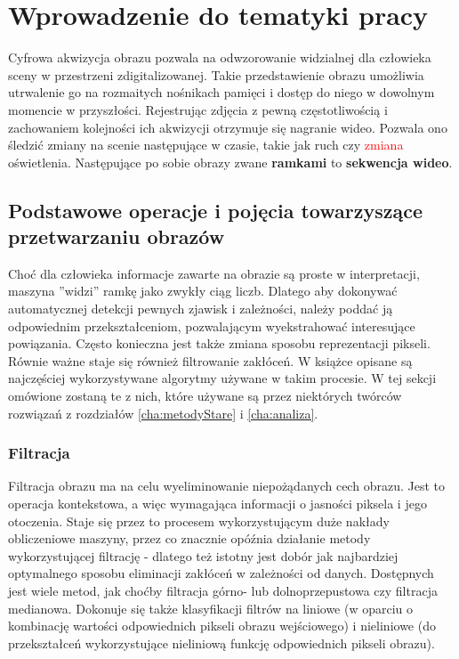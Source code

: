 \chapter{Wprowadzenie do tematyki pracy}
\label{cha:tematykaPracy}
Cyfrowa akwizycja obrazu pozwala na odwzorowanie widzialnej dla człowieka sceny w przestrzeni zdigitalizowanej. Takie przedstawienie obrazu umożliwia utrwalenie go na rozmaitych nośnikach pamięci i dostęp do niego w dowolnym momencie w przyszłości. Rejestrując zdjęcia z pewną częstotliwością i zachowaniem kolejności ich akwizycji otrzymuje się nagranie wideo. Pozwala ono śledzić zmiany na scenie następujące w czasie, takie jak ruch czy \textcolor{red}{zmiana} oświetlenia. Następujące po sobie obrazy zwane \textbf{ramkami} to \textbf{sekwencja wideo}.
\section{Podstawowe operacje i pojęcia towarzyszące przetwarzaniu obrazów}
Choć dla człowieka informacje zawarte na obrazie są proste w interpretacji, maszyna ''widzi'' ramkę jako zwykły ciąg liczb. Dlatego aby dokonywać automatycznej detekcji pewnych zjawisk i zależności, należy poddać ją odpowiednim przekształceniom, pozwalającym wyekstrahować interesujące powiązania. Często konieczna jest także zmiana sposobu reprezentacji pikseli. Równie ważne staje się również filtrowanie zakłóceń. W książce \cite{i1823330731} opisane są najczęściej wykorzystywane algorytmy używane w takim procesie. W tej sekcji omówione zostaną te z nich, które używane są przez niektórych twórców rozwiązań z rozdziałów \ref{cha:metodyStare} i \ref{cha:analiza}. 
\subsection{Filtracja}
Filtracja obrazu ma na celu wyeliminowanie niepożądanych cech obrazu. Jest to operacja kontekstowa, a więc wymagająca informacji o jasności piksela i jego otoczenia. Staje się przez to procesem wykorzystującym duże nakłady obliczeniowe maszyny, przez co znacznie opóźnia działanie metody wykorzystującej filtrację - dlatego też istotny jest dobór jak najbardziej optymalnego sposobu eliminacji zakłóceń w zależności od danych. Dostępnych jest wiele metod, jak choćby filtracja górno- lub dolnoprzepustowa czy filtracja medianowa. Dokonuje się także klasyfikacji filtrów na liniowe (w oparciu o kombinację wartości odpowiednich pikseli obrazu wejściowego) i nieliniowe (do przekształceń wykorzystujące nieliniową funkcję odpowiednich pikseli obrazu). 
